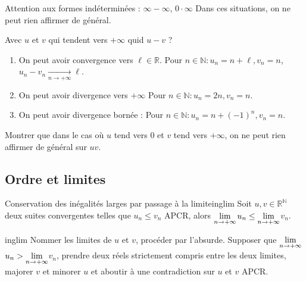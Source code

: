\documentclass[12pt,a4paper]{report}
\begin{document}
\begin{remarque}{Attention aux formes indéterminées : $\infty-\infty$, $0\cdot \infty$}
Dans ces situations, on ne peut rien affirmer de général.
\end{remarque}

\begin{exemple}
Avec $u$ et $v$ qui tendent vers $+\infty$ quid $u-v$ ?
\begin{enumerate}
\item On peut avoir convergence vers $\ell \in \mathbb{R}$.
\newline Pour $n \in \mathbb{N} : u_n = n+\ell, v_n = n$, $u_n - v_n \xrightarrow[n \rightarrow +\infty]{} \ell$.
\item On peut avoir divergence vers $+\infty$
\newline Pour $n \in \mathbb{N} : u_n = 2n, v_n=n$.
\item On peut avoir divergence bornée : 
\newline Pour $n \in \mathbb{N} : u_n = n + (-1)^n, v_n = n$.
\end{enumerate}
\end{exemple}

\begin{application}{}{}
Montrer que dans le cas où $u$ tend vers $0$ et $v$ tend vers $+\infty$, on ne peut rien affirmer de général sur $uv$.
\end{application} 


\subsection{Ordre et limites}
\begin{theoreme}{Conservation des inégalités larges par passage à la limite}{inglim}
Soit $u,v \in \mathbb{R}^\mathbb{N}$ deux suites convergentes telles que $u_n \leq v_n$ APCR, alors $\underset{n \rightarrow +\infty}{\rm{lim}}$$u_n \leq \underset{n \rightarrow +\infty}{\rm{lim}}$$v_n$.
\end{theoreme}

\begin{principedemo}{inglim}
Nommer les limites de $u$ et $v$, procéder par l'absurde. Supposer que $\underset{n \rightarrow +\infty}{\rm{lim}}$$u_n > \underset{n \rightarrow +\infty}{\rm{lim}}$$v_n$, prendre deux réels strictement compris entre les deux limites, majorer $v$ et minorer $u$ et aboutir à une contradiction sur $u$ et $v$ APCR.
\end{principedemo} 
\end{document}
